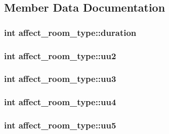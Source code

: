 \subsection{Member Data Documentation}
\hypertarget{structaffect__room__type_a506d872bdd8c237caefa09fd9a1d2e45}{
\subsubsection[{duration}]{\setlength{\rightskip}{0pt plus 5cm}int affect\-\_\-room\-\_\-type\-::duration}}\label{structaffect__room__type_a506d872bdd8c237caefa09fd9a1d2e45}
\hypertarget{structaffect__room__type_aa433c4bcbe5cd22df04be1b4e4dd4cf1}{
\subsubsection[{uu2}]{\setlength{\rightskip}{0pt plus 5cm}int affect\-\_\-room\-\_\-type\-::uu2}}\label{structaffect__room__type_aa433c4bcbe5cd22df04be1b4e4dd4cf1}
\hypertarget{structaffect__room__type_ab70101c6ccdf7b115eac8c785fe474cf}{
\subsubsection[{uu3}]{\setlength{\rightskip}{0pt plus 5cm}int affect\-\_\-room\-\_\-type\-::uu3}}\label{structaffect__room__type_ab70101c6ccdf7b115eac8c785fe474cf}
\hypertarget{structaffect__room__type_a7fc591e6c4681f4457d36a73dde10ccb}{
\subsubsection[{uu4}]{\setlength{\rightskip}{0pt plus 5cm}int affect\-\_\-room\-\_\-type\-::uu4}}\label{structaffect__room__type_a7fc591e6c4681f4457d36a73dde10ccb}
\hypertarget{structaffect__room__type_a49536cc84a081f408a3633bc723c74e1}{
\subsubsection[{uu5}]{\setlength{\rightskip}{0pt plus 5cm}int affect\-\_\-room\-\_\-type\-::uu5}}\label{structaffect__room__type_a49536cc84a081f408a3633bc723c74e1}
